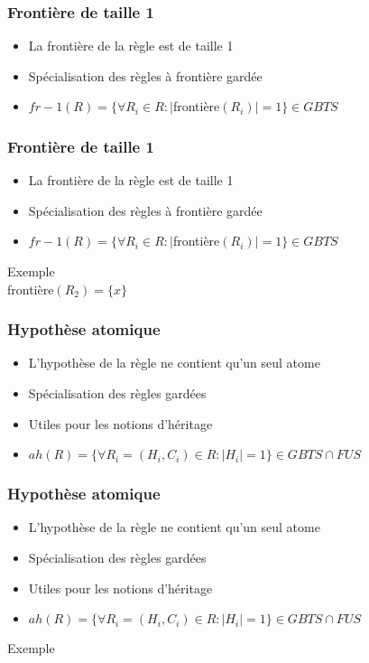 \begin{frame}
	\frametitle{Frontière de taille 1}
	\begin{itemize}
		\item La frontière de la règle est de taille 1
		\item Spécialisation des règles à frontière gardée
		\item $fr-1(R) = \{\forall R_i \in R : |$frontière$(R_i)| = 1 \} \in GBTS$
	\end{itemize}
	\vspace{10mm}
\end{frame}

\begin{frame}
	\frametitle{Frontière de taille 1}
	\begin{itemize}
		\item La frontière de la règle est de taille 1
		\item Spécialisation des règles à frontière gardée
		\item $fr-1(R) = \{\forall R_i \in R : |$frontière$(R_i)| = 1 \} \in GBTS$
	\end{itemize}
	\vspace{10mm}
	\begin{exampleblock}{Exemple}
		 \\
		frontière$(R_2) = \{x\}$
	\end{exampleblock}
\end{frame}

\begin{frame}
	\frametitle{Hypothèse atomique}
	\begin{itemize}
		\item L'hypothèse de la règle ne contient qu'un seul atome
		\item Spécialisation des règles gardées
		\item Utiles pour les notions d'héritage
		\item $ah(R) = \{\forall R_i = (H_i,C_i) \in R : |H_i| = 1 \} \in GBTS \cap FUS$
	\end{itemize}
	\vspace{10mm}
\end{frame}

\begin{frame}
	\frametitle{Hypothèse atomique}
	\begin{itemize}
		\item L'hypothèse de la règle ne contient qu'un seul atome
		\item Spécialisation des règles gardées
		\item Utiles pour les notions d'héritage
		\item $ah(R) = \{\forall R_i = (H_i,C_i) \in R : |H_i| = 1 \} \in GBTS \cap FUS$
	\end{itemize}
	\vspace{10mm}
	\begin{exampleblock}{Exemple}
	\end{exampleblock}
\end{frame}

